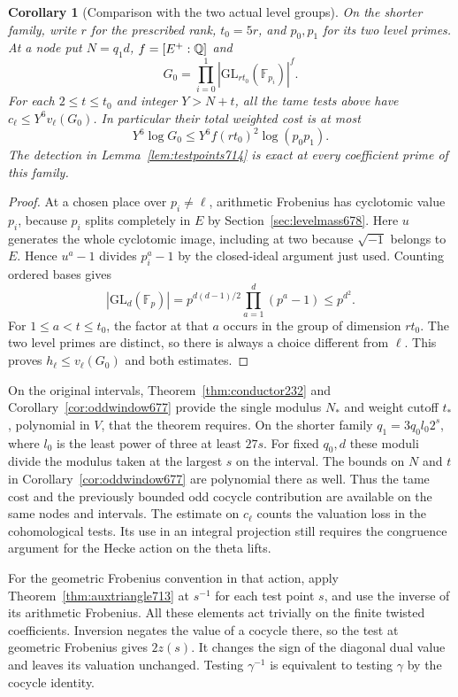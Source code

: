 \documentclass[a4paper,11pt]{article}
\newtheorem{corollary}[proposition]{Corollary}
\theoremstyle{definition}
\theoremstyle{remark}
\numberwithin{equation}{section}
\begin{document}
\begin{corollary}[Comparison with the two actual level groups]
\leavevmode\label{cor:actualmarks714}
On the shorter family, write \(r\) for the prescribed rank,
\(t_0=5r\), and \(p_0,p_1\) for its two level primes. At a node
put \(N=q_1d\), \(f=[E^+:\mathbb Q]\) and
\[
       G_0=\prod_{i=0}^1
                |\mathrm{GL}_{rt_0}(\mathbb F_{p_i})|^f .
\]
For each \(2\le t\le t_0\) and integer \(Y>N+t\), all the
tame tests above have \(c_\ell\le Y^6 v_\ell(G_0)\). In
particular their total weighted cost is at most
\[
             Y^6\log G_0 \le Y^6 f (rt_0)^2\log(p_0p_1).
\]
The detection in Lemma~\ref{lem:testpoints714} is exact at
every coefficient prime of this family.
\end{corollary}
\begin{proof}
At a chosen place over \(p_i\ne\ell\), arithmetic Frobenius
has cyclotomic value \(p_i\), because \(p_i\) splits completely
in \(E\) by Section~\ref{sec:levelmass678}. Here \(u\) generates
the whole cyclotomic image, including at two because \(\sqrt{-1}\)
belongs to \(E\). Hence \(u^a-1\) divides \(p_i^a-1\) by the
closed-ideal argument just used. Counting ordered bases gives
\[
    |\mathrm{GL}_d(\mathbb F_p)|
        =p^{d(d-1)/2}\prod_{a=1}^d(p^a-1) \le p^{d^2}.
\]
For \(1\le a<t\le t_0\), the factor at that \(a\) occurs in
the group of dimension \(rt_0\). The two level primes are
distinct, so there is always a choice different from \(\ell\).
This proves \(h_\ell\le v_\ell(G_0)\) and both estimates.
\end{proof}

On the original intervals, Theorem~\ref{thm:conductor232} and
Corollary~\ref{cor:oddwindow677} provide the single modulus
\(N_*\) and weight cutoff \(t_*\), polynomial in \(V\), that
the theorem requires. On the shorter family \(q_1=3q_0l_0 2^s\),
where \(l_0\) is the least power of three at least \(27s\).
For fixed \(q_0,d\) these moduli divide the modulus taken at
the largest \(s\) on the interval. The bounds on \(N\) and
\(t\) in Corollary~\ref{cor:oddwindow677} are polynomial there
as well. Thus the tame cost and the previously bounded odd
cocycle contribution are available on the same nodes and
intervals. The estimate on \(c_\ell\) counts the valuation
loss in the cohomological tests. Its use in an integral
projection still requires the congruence argument for the
Hecke action on the theta lifts.

For the geometric Frobenius convention in that action, apply
Theorem~\ref{thm:auxtriangle713} at \(s^{-1}\) for each test
point \(s\), and use the inverse of its arithmetic Frobenius.
All these elements act trivially on the finite twisted
coefficients. Inversion negates the value of a cocycle there,
so the test at geometric Frobenius gives \(2z(s)\). It changes
the sign of the diagonal dual value and leaves its valuation
unchanged. Testing \(\gamma^{-1}\) is equivalent to testing
\(\gamma\) by the cocycle identity.
\clearpage
\end{document}
